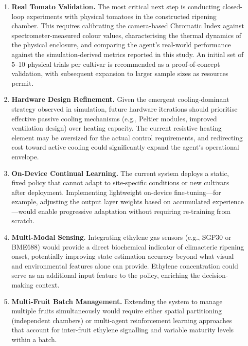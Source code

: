     \begin{enumerate}
        \item \textbf{Real Tomato Validation.} The most critical next step is conducting closed-loop experiments with physical tomatoes in the constructed ripening chamber. This requires calibrating the camera-based Chromatic Index against spectrometer-measured colour values, characterising the thermal dynamics of the physical enclosure, and comparing the agent's real-world performance against the simulation-derived metrics reported in this study. An initial set of 5--10 physical trials per cultivar is recommended as a proof-of-concept validation, with subsequent expansion to larger sample sizes as resources permit.

        \item \textbf{Hardware Design Refinement.} Given the emergent cooling-dominant strategy observed in simulation, future hardware iterations should prioritise effective passive cooling mechanisms (e.g., Peltier modules, improved ventilation design) over heating capacity. The current resistive heating element may be oversized for the actual control requirements, and redirecting cost toward active cooling could significantly expand the agent's operational envelope.

        \item \textbf{On-Device Continual Learning.} The current system deploys a static, fixed policy that cannot adapt to site-specific conditions or new cultivars after deployment. Implementing lightweight on-device fine-tuning---for example, adjusting the output layer weights based on accumulated experience---would enable progressive adaptation without requiring re-training from scratch.

        \item \textbf{Multi-Modal Sensing.} Integrating ethylene gas sensors (e.g., SGP30 or BME688) would provide a direct biochemical indicator of climacteric ripening onset, potentially improving state estimation accuracy beyond what visual and environmental features alone can provide. Ethylene concentration could serve as an additional input feature to the policy, enriching the decision-making context.

        \item \textbf{Multi-Fruit Batch Management.} Extending the system to manage multiple fruits simultaneously would require either spatial partitioning (independent chambers) or multi-agent reinforcement learning approaches that account for inter-fruit ethylene signalling and variable maturity levels within a batch.


\end{enumerate}
